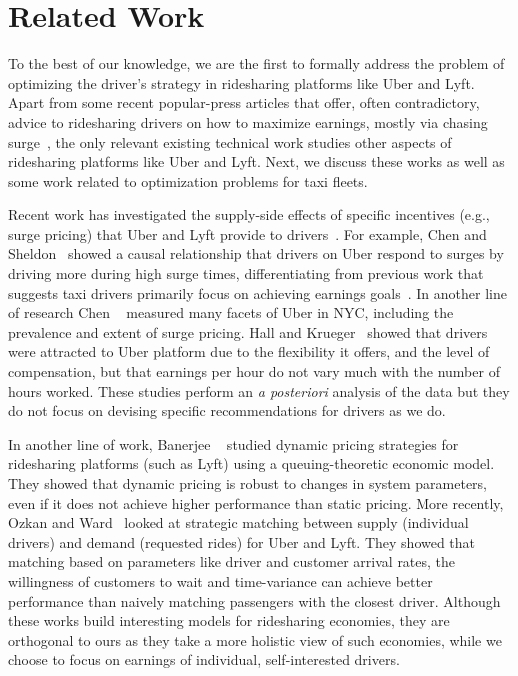 
\section{Related Work}
\label{sec:related_work}

To the best of our knowledge, we are the first to formally address the problem of optimizing
the driver's strategy in ridesharing platforms like Uber and Lyft. 
Apart from 
some recent popular-press articles that 
offer, often contradictory, advice to ridesharing drivers on how to maximize earnings, mostly via chasing surge~\cite{dont,tips}, 
the only relevant existing technical work 
studies other aspects of ridesharing platforms like Uber and Lyft. 
Next, we discuss these works as well as some work related to optimization problems
for taxi fleets.


Recent work has investigated the supply-side effects of specific incentives (e.g., surge pricing) that Uber and Lyft provide to drivers~\cite{slaves}.  For example, Chen and Sheldon~\cite{chen2016dynamic} showed a causal relationship that drivers on Uber respond to surges by driving more during high surge times,  differentiating from previous work that suggests taxi drivers primarily focus on achieving earnings goals~\cite{camerer1997labor}. 
In another line of research
Chen {\etal}~\cite{chen2015peeking} measured many facets of Uber in NYC, including the prevalence and extent 
  of surge pricing.
Hall and Krueger~\cite{hall2016analysis} showed that drivers were attracted to Uber platform due to the flexibility it offers, 
and the level of compensation, but that earnings per hour do not vary much with the number of hours worked. 
These studies perform an {\em a posteriori} analysis of the data
but they do not focus on devising specific recommendations for drivers as we do.


 In another line of work, Banerjee {\etal}~\cite{banerjee2015pricing} studied  
 dynamic
pricing strategies for ridesharing platforms (such as Lyft) using a 
queuing-theoretic economic model. 
They showed that dynamic pricing is robust to changes in system parameters, even if it does not 
  achieve higher performance than static pricing.  
More recently, Ozkan and Ward~\cite{ozkan2016dynamic} looked at strategic matching between supply (individual drivers) 
  and demand (requested rides) for Uber and Lyft.
They showed that matching based on parameters like driver and customer arrival rates,  the willingness of customers to wait and time-variance can achieve better performance than naively matching 
passengers with the closest driver. 
Although these works build interesting models for ridesharing economies, they are
orthogonal to ours as they take a more holistic view of such economies, while we choose to focus 
 on earnings of individual, self-interested drivers.




